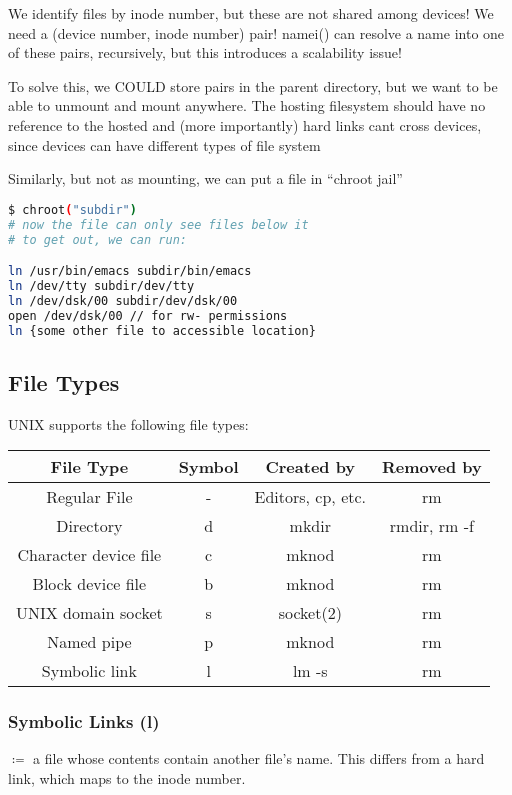 \documentclass[../../lecture_notes.tex]{subfiles}
\begin{document}
We identify files by inode number, but these are not shared among devices! We need a (device number, inode number) pair! namei() can resolve a name into one of these pairs, recursively, but this introduces a scalability issue!

To solve this, we COULD store pairs in the parent directory, but we want to be able to unmount and mount anywhere. The hosting filesystem should have no reference to the hosted and (more importantly) hard links cant cross devices, since devices can have different types of file system

Similarly, but not as mounting, we can put a file in “chroot jail”
\begin{lstlisting}[language=sh]
$ chroot("subdir")
# now the file can only see files below it
# to get out, we can run:

ln /usr/bin/emacs subdir/bin/emacs
ln /dev/tty subdir/dev/tty
ln /dev/dsk/00 subdir/dev/dsk/00
open /dev/dsk/00 // for rw- permissions
ln {some other file to accessible location}
\end{lstlisting}


\subsection{File Types}

UNIX supports the following file types:

\begin{center}
\def\arraystretch{1.5}
\begin{tabular} { | c | c | c | c | }
	\hline
	File Type & Symbol & Created by & Removed by \\
	\hline\hline
	Regular File & - & Editors, cp, etc. & rm \\
	\hline
	Directory & d & mkdir & rmdir, rm -f \\
	\hline
	Character device file & c & mknod & rm \\
	\hline
	Block device file & b & mknod & rm \\
	\hline
	UNIX domain socket & s & socket(2) & rm \\
	\hline
	Named pipe & p & mknod & rm \\
	\hline
	Symbolic link & l & lm -s & rm \\
	\hline
\end{tabular}
\end{center}

\subsubsection*{Symbolic Links (l)}
$\coloneqq$ a file whose contents contain another file’s name. This differs from a hard link, which maps to the inode number.
\end{document}
